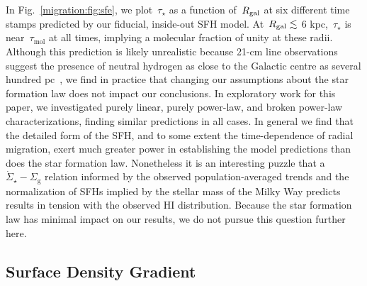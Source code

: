 In Fig.~\ref{migration:fig:sfe}, we plot~$\tau_\star$ as a function of~$R_\text{gal}$ at 
six different time stamps predicted by our fiducial, inside-out SFH model. 
At~$R_\text{gal} \lesssim$ 6 kpc,~$\tau_\star$ is near~$\tau_\text{mol}$ at all 
times, implying a molecular fraction of unity at these radii. 
Although this prediction is likely unrealistic because 21-cm line observations 
suggest the presence of neutral hydrogen as close to the Galactic centre as 
several hundred pc~\citep{Kalberla2009}, we find in practice that changing our 
assumptions about the star formation law does not impact our conclusions. 
In exploratory work for this paper, we investigated purely linear, purely 
power-law, and broken power-law characterizations, finding similar predictions 
in all cases. 
In general we find that the detailed form of the SFH, and to some extent the 
time-dependence of radial migration, exert much greater power in establishing 
the model predictions than does the star formation law. 
Nonetheless it is an interesting puzzle that a 
$\dot{\Sigma}_\star - \Sigma_\text{g}$ relation informed by the observed 
population-averaged trends and the normalization of SFHs implied by the stellar 
mass of the Milky Way predicts results in tension with the observed HI 
distribution. 
Because the star formation law has minimal impact on our results, we do not 
pursue this question further here. 

\subsection{Surface Density Gradient} 
\label{migration:sec:methods:surface_density_gradient} 


